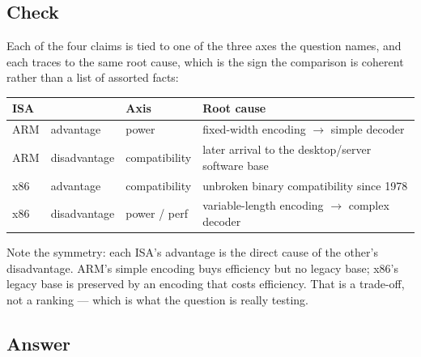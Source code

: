 \subsection*{Check}

Each of the four claims is tied to one of the three axes the question names, and
each traces to the same root cause, which is the sign the comparison is coherent
rather than a list of assorted facts:

\begin{center}
\begin{tabular}{llll}
  \toprule
  ISA & & Axis & Root cause \\
  \midrule
  ARM & advantage    & power         & fixed-width encoding $\to$ simple decoder \\
  ARM & disadvantage & compatibility & later arrival to the desktop/server software base \\
  x86 & advantage    & compatibility & unbroken binary compatibility since 1978 \\
  x86 & disadvantage & power / perf  & variable-length encoding $\to$ complex decoder \\
  \bottomrule
\end{tabular}
\end{center}

Note the symmetry: each ISA's advantage is the direct cause of the other's
disadvantage. ARM's simple encoding buys efficiency but no legacy base; x86's
legacy base is preserved by an encoding that costs efficiency. That is a
trade-off, not a ranking — which is what the question is really testing.

\subsection*{Answer}

